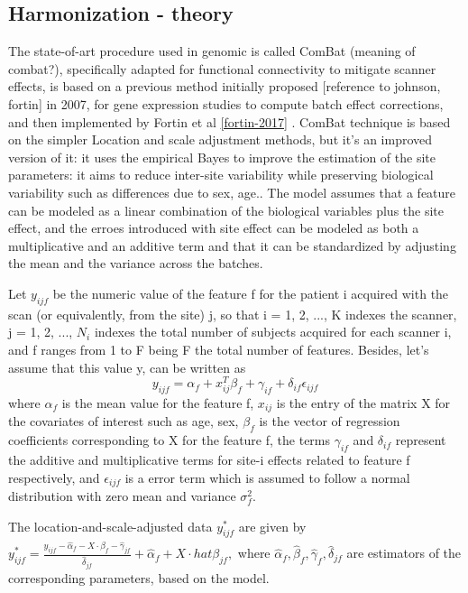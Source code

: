 \documentclass[a4paper,11pt]{article}
\begin{document}
\subsection{Harmonization - theory}\label{sec:harmonizationtheory}


The state-of-art procedure used in genomic is called ComBat (meaning of combat?), specifically adapted for functional connectivity to mitigate scanner effects, is based on a previous method initially proposed [reference to johnson, fortin] in 2007, for gene expression studies to compute batch effect corrections, and then implemented by Fortin et al \ref{fortin-2017} .
ComBat technique is based on the simpler Location and scale adjustment methods, but it's an improved version of it: it uses the empirical Bayes to improve the estimation of the site parameters: it aims to reduce inter-site variability while preserving biological variability such as differences due to sex, age..
The model assumes that a feature can be modeled as a linear combination of the biological variables plus the site effect, and the erroes introduced with site effect can be modeled as both a multiplicative and an additive term and that it can be standardized by adjusting the mean and the variance across the batches.


Let $y_{ijf}$ be the numeric value of the feature f for the patient i acquired with the scan (or equivalently, from the site) j, so that i = 1, 2, ..., K indexes the scanner, j = 1, 2, ..., $N_i$ indexes the total number of subjects acquired for each scanner i, and f ranges from 1 to F being F the total number of features. Besides, let's assume that this value y, can be written as
\begin{equation}
y_{ijf} = \alpha_f + x_{ij}^T \beta _f + \gamma_{if} + \delta_{if} \epsilon_{ijf}
\end{equation}
where $\alpha_f$ is the mean value for the feature f, $x_{ij}$ is the entry of the matrix X for the covariates of interest such as age, sex, $\beta_f$ is the vector of regression coefficients corresponding to X for the feature f, the terms $\gamma_{if}$ and $\delta_{if}$ represent the additive and multiplicative terms for site-i effects related to feature f respectively, and $\epsilon_{ijf}$ is a error term which is assumed to follow a normal distribution with zero mean and variance $\sigma_f^2$.


The location-and-scale-adjusted data $y^{\ast}_{ijf}$ are given by $y^{\ast}_{ijf} = \frac{y_{ijf} - \hat \alpha_f - X\cdot \hat \beta_f - \hat \gamma_{jf}}{\hat \delta_{jf}} + \hat \alpha_f + X \cdot hat \beta_{jf},$
where $\hat \alpha_f , \hat \beta_f , \hat \gamma_f ,  \hat \delta_{jf}$ are estimators of the corresponding parameters, based on the model.
\end{document}
